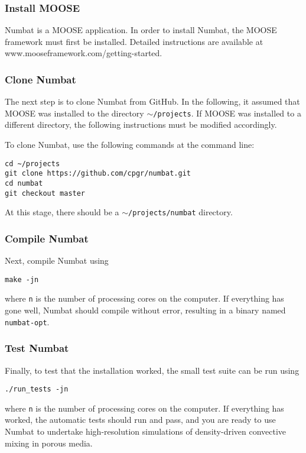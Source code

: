 \documentclass[11pt, a4paper]{csiroreport2012}
\begin{document}
\subsubsection*{Install MOOSE}
 Numbat is  a MOOSE application. In order to install Numbat, the MOOSE framework must first be installed. Detailed instructions are available at www.mooseframework.com/getting-started.
 
 \subsubsection*{Clone Numbat}
 
 The next step is to clone Numbat from GitHub. In the following, it assumed that MOOSE was installed to the directory \texttt{$\sim$/projects}. If MOOSE was installed to a different directory, the following instructions must be modified accordingly.

To clone Numbat, use the following commands at the command line:

\begin{verbatim}
cd ~/projects
git clone https://github.com/cpgr/numbat.git
cd numbat
git checkout master
\end{verbatim}

At this stage, there should be a \texttt{$\sim$/projects/numbat} directory.

\subsubsection*{Compile Numbat}
Next, compile Numbat using
\begin{verbatim}
make -jn
\end{verbatim}
where \texttt{n} is the number of processing cores on the computer. If everything has gone well, Numbat should compile without error, resulting in a binary named \texttt{numbat-opt}.

\subsubsection*{Test Numbat}
Finally, to test that the installation worked, the small test suite can be run using
\begin{verbatim}
./run_tests -jn
\end{verbatim}
where \texttt{n} is the number of processing cores on the computer. If everything has worked, the automatic tests should run and pass, and you are ready to use Numbat to undertake high-resolution simulations of density-driven convective mixing in porous media.
\end{document}
